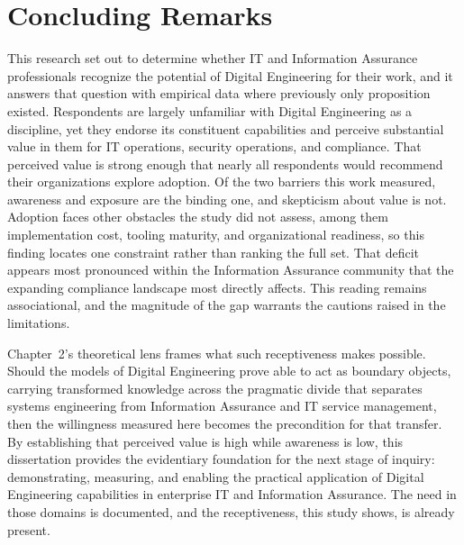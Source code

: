 \section{Concluding Remarks}

This research set out to determine whether IT and Information Assurance professionals recognize the potential of Digital Engineering for their work, and it answers that question with empirical data where previously only proposition existed. Respondents are largely unfamiliar with Digital Engineering as a discipline, yet they endorse its constituent capabilities and perceive substantial value in them for IT operations, security operations, and compliance. That perceived value is strong enough that nearly all respondents would recommend their organizations explore adoption. Of the two barriers this work measured, awareness and exposure are the binding one, and skepticism about value is not. Adoption faces other obstacles the study did not assess, among them implementation cost, tooling maturity, and organizational readiness, so this finding locates one constraint rather than ranking the full set. That deficit appears most pronounced within the Information Assurance community that the expanding compliance landscape most directly affects. This reading remains associational, and the magnitude of the gap warrants the cautions raised in the limitations.

Chapter~2's theoretical lens frames what such receptiveness makes possible. Should the models of Digital Engineering prove able to act as boundary objects, carrying transformed knowledge across the pragmatic divide that separates systems engineering from Information Assurance and IT service management, then the willingness measured here becomes the precondition for that transfer. By establishing that perceived value is high while awareness is low, this dissertation provides the evidentiary foundation for the next stage of inquiry: demonstrating, measuring, and enabling the practical application of Digital Engineering capabilities in enterprise IT and Information Assurance. The need in those domains is documented, and the receptiveness, this study shows, is already present.
